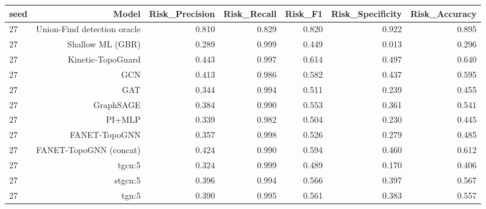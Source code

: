 \begin{tabular}{lrrrrrr}
\toprule
seed & Model & Risk\_Precision & Risk\_Recall & Risk\_F1 & Risk\_Specificity & Risk\_Accuracy \\
\midrule
27 & Union-Find detection oracle & 0.810 & 0.829 & 0.820 & 0.922 & 0.895 \\
27 & Shallow ML (GBR) & 0.289 & 0.999 & 0.449 & 0.013 & 0.296 \\
27 & Kinetic-TopoGuard & 0.443 & 0.997 & 0.614 & 0.497 & 0.640 \\
27 & GCN & 0.413 & 0.986 & 0.582 & 0.437 & 0.595 \\
27 & GAT & 0.344 & 0.994 & 0.511 & 0.239 & 0.455 \\
27 & GraphSAGE & 0.384 & 0.990 & 0.553 & 0.361 & 0.541 \\
27 & PI+MLP & 0.339 & 0.982 & 0.504 & 0.230 & 0.445 \\
27 & FANET-TopoGNN & 0.357 & 0.998 & 0.526 & 0.279 & 0.485 \\
27 & FANET-TopoGNN (concat) & 0.424 & 0.990 & 0.594 & 0.460 & 0.612 \\
27 & tgcn:5 & 0.324 & 0.999 & 0.489 & 0.170 & 0.406 \\
27 & stgcn:5 & 0.396 & 0.994 & 0.566 & 0.397 & 0.567 \\
27 & tgn:5 & 0.390 & 0.995 & 0.561 & 0.383 & 0.557 \\
\bottomrule
\end{tabular}